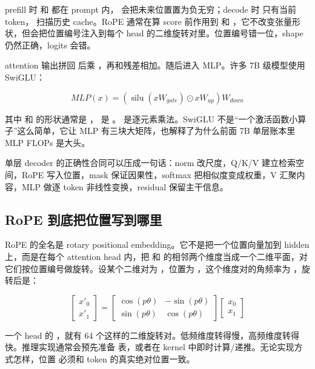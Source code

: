 prefill 时  和  都在 prompt 内， 会把未来位置置为负无穷；decode 时  只有当前 token， 扫描历史 cache。RoPE 通常在算 score 前作用到  和 ，它不改变张量形状，但会把位置编号注入到每个 head 的二维旋转对里。位置编号错一位，shape 仍然正确，logits 会错。

attention 输出拼回 \code{[N,n_q*d]} 后乘 ，再和残差相加。随后进入 MLP。许多 7B 级模型使用 SwiGLU：

\[
MLP(x)=\left(\operatorname{silu}(xW_{gate}) \odot xW_{up}\right)W_{down}
\]

其中  和  的形状通常是 \code{[H,I]}， 是 \code{[I,H]}。\code{\odot} 是逐元素乘法。SwiGLU 不是“一个激活函数小算子”这么简单，它让 MLP 有三块大矩阵，也解释了为什么前面 7B 单层账本里 MLP FLOPs 是大头。

\begin{keyidea}
单层 decoder 的正确性合同可以压成一句话：norm 改尺度，Q/K/V 建立检索空间，RoPE 写入位置，mask 保证因果性，softmax 把相似度变成权重，V 汇聚内容，MLP 做逐 token 非线性变换，residual 保留主干信息。
\end{keyidea}

\subsection{RoPE 到底把位置写到哪里}

RoPE 的全名是 rotary positional embedding。它不是把一个位置向量加到 hidden 上，而是在每个 attention head 内，把  和  的相邻两个维度当成一个二维平面，对它们按位置编号做旋转。设某个二维对为 \code{[x_0,x_1]}，位置为 ，这个维度对的角频率为 \code{\theta}，旋转后是：

\[
\begin{bmatrix}
x'_0\\
x'_1
\end{bmatrix}
=
\begin{bmatrix}
\cos(p\theta) & -\sin(p\theta)\\
\sin(p\theta) & \cos(p\theta)
\end{bmatrix}
\begin{bmatrix}
x_0\\
x_1
\end{bmatrix}
\]

一个 head 的 ，就有 64 个这样的二维旋转对。低频维度转得慢，高频维度转得快。推理实现通常会预先准备  表，或者在 kernel 中即时计算/递推。无论实现方式怎样，位置  必须和 token 的真实绝对位置一致。

